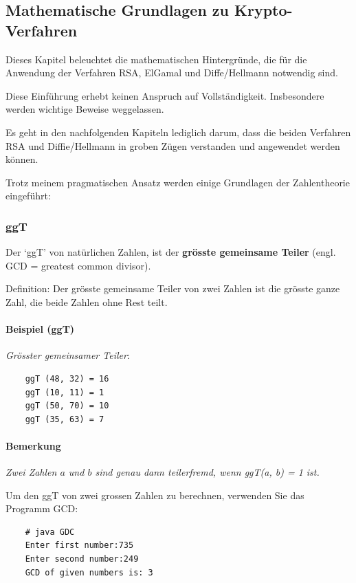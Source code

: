 \subsection{Mathematische Grundlagen zu Krypto-Verfahren}

Dieses Kapitel beleuchtet die mathematischen Hintergründe, die für
die Anwendung der Verfahren RSA, ElGamal und Diffe/Hellmann notwendig sind.

Diese Einführung erhebt keinen Anspruch auf Vollständigkeit.
Insbesondere werden wichtige Beweise weggelassen.

Es geht in den nachfolgenden Kapiteln lediglich darum, dass die
beiden Verfahren RSA und Diffie/Hellmann in groben Zügen verstanden
und angewendet werden können.

Trotz meinem pragmatischen Ansatz werden einige Grundlagen der
Zahlentheorie eingeführt:

\subsubsection*{ggT}

Der `ggT' von natürlichen Zahlen, ist der \textbf{grösste gemeinsame
Teiler} (engl. GCD = greatest common divisor).

Definition: Der grösste gemeinsame Teiler von zwei Zahlen ist die
grösste ganze Zahl, die beide Zahlen ohne Rest teilt.

\paragraph*{Beispiel (ggT)}
\emph{Grösster gemeinsamer Teiler}:

\begin{verbatim}
    ggT (48, 32) = 16
    ggT (10, 11) = 1
    ggT (50, 70) = 10
    ggT (35, 63) = 7
\end{verbatim}

\paragraph*{Bemerkung}
\emph{Zwei Zahlen $a$ und $b$ sind genau dann teilerfremd, wenn ggT(a, b) = 1 ist.}

Um den ggT von zwei grossen Zahlen zu berechnen, verwenden Sie das Programm GCD:

\begin{verbatim}
    # java GDC
    Enter first number:735
    Enter second number:249
    GCD of given numbers is: 3
\end{verbatim}

